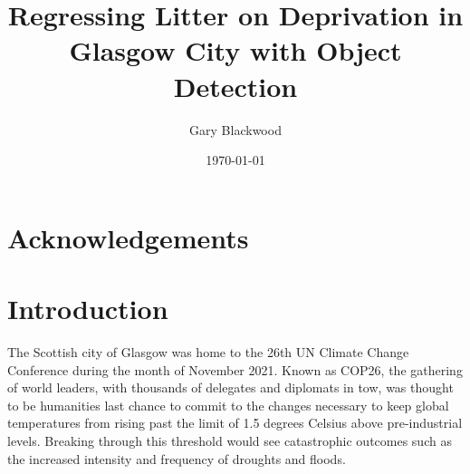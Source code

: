 \documentclass{thesis}
\begin{document}

\title{Regressing Litter on Deprivation in Glasgow City with Object Detection}
\author{Gary Blackwood}
\date{\today}
\maketitle


\begin{abstract}
\end{abstract}


\chapter*{Acknowledgements}
\todo{}


\listoffigures
\listoftables


\tableofcontents


\chapter{Introduction}

The Scottish city of Glasgow was home to the 26th UN Climate Change Conference during the month of November 2021. Known as COP26, the gathering of world leaders, with thousands of delegates and diplomats in tow, was thought to be humanities last chance to commit to the changes necessary to keep global temperatures from rising past the limit of 1.5 degrees Celsius above pre-industrial levels. Breaking through this threshold would see catastrophic outcomes such as the increased intensity and frequency of droughts and floods\cite{impacts-of-15}.
\end{document}
